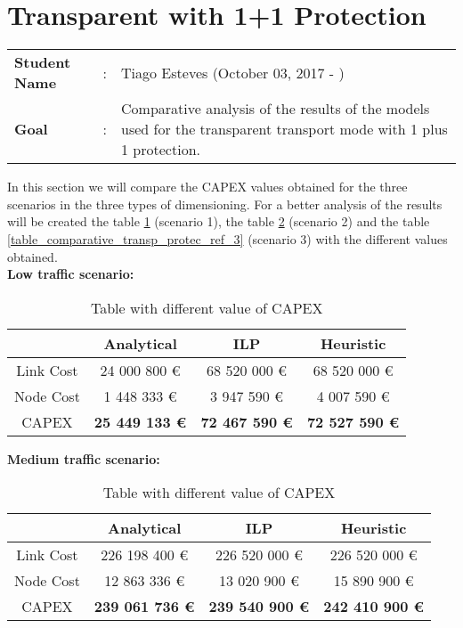 \clearpage

\section{Transparent with 1+1 Protection}\label{comparative_Transp_Protection}
\begin{tcolorbox}	
\begin{tabular}{p{2.75cm} p{0.2cm} p{10.5cm}} 	
\textbf{Student Name}  &:& Tiago Esteves    (October 03, 2017 - )\\
\textbf{Goal}          &:& Comparative analysis of the results of the models used for the transparent transport mode with 1 plus 1 protection.
\end{tabular}
\end{tcolorbox}
\vspace{11pt}


In this section we will compare the CAPEX values obtained for the three scenarios in the three types of dimensioning. For a better analysis of the results will be created the table \ref{table_comparative_transp_protec_ref_1} (scenario 1), the table \ref{table_comparative_transp_protec_ref_2} (scenario 2) and the table \ref{table_comparative_transp_protec_ref_3} (scenario 3) with the different values obtained.\\

\textbf{Low traffic scenario:}\\

\begin{table}[h!]
\centering
\begin{tabular}{| c | c | c | c |}
 \hline
   & Analytical & ILP & Heuristic \\
 \hline\hline
 Link Cost & 24 000 800 \euro & 68 520 000 \euro & 68 520 000 \euro \\
 Node Cost & 1 448 333 \euro & 3 947 590 \euro & 4 007 590 \euro \\
 CAPEX & \textbf{25 449 133 \euro} & \textbf{72 467 590 \euro} & \textbf{72 527 590 \euro} \\
 \hline
\end{tabular}
\caption{Table with different value of CAPEX }
\label{table_comparative_transp_protec_ref_1}
\end{table}


\vspace{11pt}
\textbf{Medium traffic scenario:}\\

\begin{table}[h!]
\centering
\begin{tabular}{| c | c | c | c |}
 \hline
   & Analytical & ILP & Heuristic \\
 \hline\hline
 Link Cost & 226 198 400 \euro & 226 520 000 \euro & 226 520 000 \euro \\
 Node Cost & 12 863 336 \euro & 13 020 900 \euro & 15 890 900 \euro \\
 CAPEX & \textbf{239 061 736 \euro} & \textbf{239 540 900 \euro*} & \textbf{242 410 900 \euro} \\
 \hline
\end{tabular}
\caption{Table with different value of CAPEX }
\label{table_comparative_transp_protec_ref_2}
\end{table}


